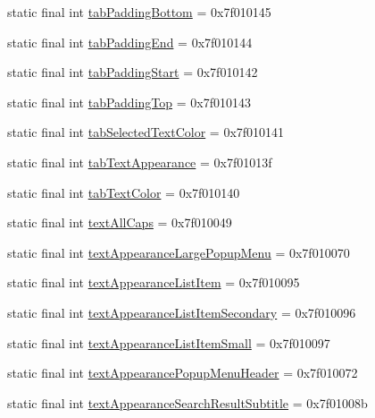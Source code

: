 \begin{CompactItemize}
\item 
static final int \hyperlink{classandroid_1_1support_1_1v4_1_1_r_1_1attr_18991a8bcecb220375deb0c5aafd6216}{tabPaddingBottom} = 0x7f010145
\item 
static final int \hyperlink{classandroid_1_1support_1_1v4_1_1_r_1_1attr_8875722550b099f83e12718568bb8fa4}{tabPaddingEnd} = 0x7f010144
\item 
static final int \hyperlink{classandroid_1_1support_1_1v4_1_1_r_1_1attr_78a6b497af5c077a5222e8ce8bf7d618}{tabPaddingStart} = 0x7f010142
\item 
static final int \hyperlink{classandroid_1_1support_1_1v4_1_1_r_1_1attr_9d331931d68e20f43f550fdbb918f7e9}{tabPaddingTop} = 0x7f010143
\item 
static final int \hyperlink{classandroid_1_1support_1_1v4_1_1_r_1_1attr_02912e41f6b2e68b8c38b71075f5db62}{tabSelectedTextColor} = 0x7f010141
\item 
static final int \hyperlink{classandroid_1_1support_1_1v4_1_1_r_1_1attr_b66b687353f46eac0a74ced92d773205}{tabTextAppearance} = 0x7f01013f
\item 
static final int \hyperlink{classandroid_1_1support_1_1v4_1_1_r_1_1attr_0d1040f3c94d4aee900ca93b633da9d7}{tabTextColor} = 0x7f010140
\item 
static final int \hyperlink{classandroid_1_1support_1_1v4_1_1_r_1_1attr_ac76588229a187640be143ffaac296c9}{textAllCaps} = 0x7f010049
\item 
static final int \hyperlink{classandroid_1_1support_1_1v4_1_1_r_1_1attr_22a775eef7aa27f448bf3812b1c19363}{textAppearanceLargePopupMenu} = 0x7f010070
\item 
static final int \hyperlink{classandroid_1_1support_1_1v4_1_1_r_1_1attr_5387aabe03b6f474b4aa90cc0f58fdae}{textAppearanceListItem} = 0x7f010095
\item 
static final int \hyperlink{classandroid_1_1support_1_1v4_1_1_r_1_1attr_146163ad5fca51abe9580209a0323038}{textAppearanceListItemSecondary} = 0x7f010096
\item 
static final int \hyperlink{classandroid_1_1support_1_1v4_1_1_r_1_1attr_1949dd6e6dda5f239bb132cc79698407}{textAppearanceListItemSmall} = 0x7f010097
\item 
static final int \hyperlink{classandroid_1_1support_1_1v4_1_1_r_1_1attr_d4d771683a13cf24cf381a9b70600b2d}{textAppearancePopupMenuHeader} = 0x7f010072
\item 
static final int \hyperlink{classandroid_1_1support_1_1v4_1_1_r_1_1attr_63f3995013d8eb35ecc25446fbd58a1e}{textAppearanceSearchResultSubtitle} = 0x7f01008b

\end{CompactItemize}
